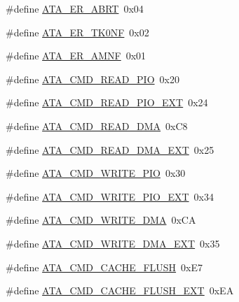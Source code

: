 \begin{DoxyCompactItemize}
\item 
\#define \hyperlink{a00005_a415987608bff240636a785bb48970e94_a415987608bff240636a785bb48970e94}{A\+T\+A\+\_\+\+E\+R\+\_\+\+A\+B\+RT}~0x04
\item 
\#define \hyperlink{a00005_aaffca74832da09d4cf0ea68624546c91_aaffca74832da09d4cf0ea68624546c91}{A\+T\+A\+\_\+\+E\+R\+\_\+\+T\+K0\+NF}~0x02
\item 
\#define \hyperlink{a00005_ac4f0c06f285d99068cbad7b6d4641d1f_ac4f0c06f285d99068cbad7b6d4641d1f}{A\+T\+A\+\_\+\+E\+R\+\_\+\+A\+M\+NF}~0x01
\item 
\#define \hyperlink{a00005_a91a96db8427a8caa254a218f05dcb3f4_a91a96db8427a8caa254a218f05dcb3f4}{A\+T\+A\+\_\+\+C\+M\+D\+\_\+\+R\+E\+A\+D\+\_\+\+P\+IO}~0x20
\item 
\#define \hyperlink{a00005_a3165497b4d8eb30297a4d62e39846b01_a3165497b4d8eb30297a4d62e39846b01}{A\+T\+A\+\_\+\+C\+M\+D\+\_\+\+R\+E\+A\+D\+\_\+\+P\+I\+O\+\_\+\+E\+XT}~0x24
\item 
\#define \hyperlink{a00005_aefab351e75e10b6dbfa0b7828031cda4_aefab351e75e10b6dbfa0b7828031cda4}{A\+T\+A\+\_\+\+C\+M\+D\+\_\+\+R\+E\+A\+D\+\_\+\+D\+MA}~0x\+C8
\item 
\#define \hyperlink{a00005_a42247550c708b2b7852927180c7dde78_a42247550c708b2b7852927180c7dde78}{A\+T\+A\+\_\+\+C\+M\+D\+\_\+\+R\+E\+A\+D\+\_\+\+D\+M\+A\+\_\+\+E\+XT}~0x25
\item 
\#define \hyperlink{a00005_a64f2c50b916f1f67018c36f75f811cc7_a64f2c50b916f1f67018c36f75f811cc7}{A\+T\+A\+\_\+\+C\+M\+D\+\_\+\+W\+R\+I\+T\+E\+\_\+\+P\+IO}~0x30
\item 
\#define \hyperlink{a00005_ac8e433782c7125e6929673907eca6f17_ac8e433782c7125e6929673907eca6f17}{A\+T\+A\+\_\+\+C\+M\+D\+\_\+\+W\+R\+I\+T\+E\+\_\+\+P\+I\+O\+\_\+\+E\+XT}~0x34
\item 
\#define \hyperlink{a00005_a41dc931ac3c2c6733a2a67d03eaf1674_a41dc931ac3c2c6733a2a67d03eaf1674}{A\+T\+A\+\_\+\+C\+M\+D\+\_\+\+W\+R\+I\+T\+E\+\_\+\+D\+MA}~0x\+CA
\item 
\#define \hyperlink{a00005_a3a75d9e39518e704f3a4b39e6a3d998c_a3a75d9e39518e704f3a4b39e6a3d998c}{A\+T\+A\+\_\+\+C\+M\+D\+\_\+\+W\+R\+I\+T\+E\+\_\+\+D\+M\+A\+\_\+\+E\+XT}~0x35
\item 
\#define \hyperlink{a00005_a23e8deb17b95336898b52cc76d5206af_a23e8deb17b95336898b52cc76d5206af}{A\+T\+A\+\_\+\+C\+M\+D\+\_\+\+C\+A\+C\+H\+E\+\_\+\+F\+L\+U\+SH}~0x\+E7
\item 
\#define \hyperlink{a00005_a3c624c2041a51a473bd6e77b7753d475_a3c624c2041a51a473bd6e77b7753d475}{A\+T\+A\+\_\+\+C\+M\+D\+\_\+\+C\+A\+C\+H\+E\+\_\+\+F\+L\+U\+S\+H\+\_\+\+E\+XT}~0x\+EA

\end{DoxyCompactItemize}
